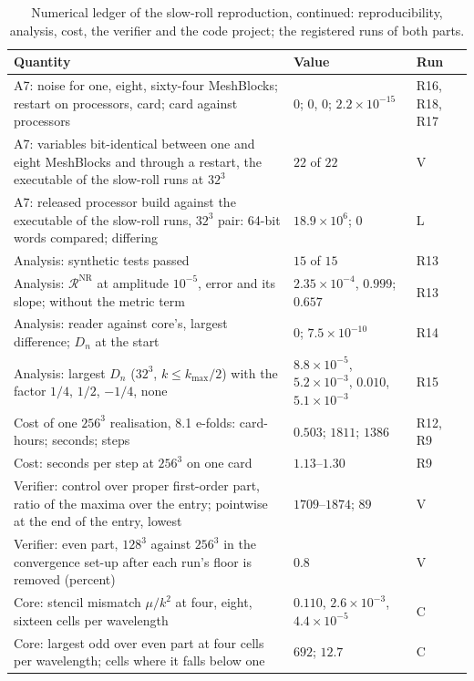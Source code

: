 \begin{table}
\caption{\label{tab:ledgerG1b}Numerical ledger of the slow-roll reproduction, continued: reproducibility, analysis, cost, the verifier and the code project; the registered runs of both parts.}
\begin{ruledtabular}
\footnotesize
\begin{tabular}{p{}p{}p{}}
Quantity & Value & Run \\
\hline
A7: noise for one, eight, sixty-four MeshBlocks; restart on processors, card; card against processors & $0$; $0$, $0$; $2.2\times10^{-15}$ & R16, R18, R17 \\
A7: variables bit-identical between one and eight MeshBlocks and through a restart, the executable of the slow-roll runs at $32^3$ & $22$ of $22$ & V \\
A7: released processor build against the executable of the slow-roll runs, $32^3$ pair: 64-bit words compared; differing & $18.9\times10^{6}$; $0$ & L \\
Analysis: synthetic tests passed & $15$ of $15$ & R13 \\
Analysis: $\mathcal{R}^\mathrm{NR}$ at amplitude $10^{-5}$, error and its slope; without the metric term & $2.35\times10^{-4}$, $0.999$; $0.657$ & R13 \\
Analysis: reader against core's, largest difference; $D_n$ at the start & $0$; $7.5\times10^{-10}$ & R14 \\
Analysis: largest $D_n$ ($32^3$, $k\leq k_\mathrm{max}/2$) with the factor $1/4$, $1/2$, $-1/4$, none & $8.8\times10^{-5}$, $5.2\times10^{-3}$, $0.010$, $5.1\times10^{-3}$ & R15 \\
Cost of one $256^3$ realisation, 8.1 e-folds: card-hours; seconds; steps & $0.503$; $1811$; $1386$ & R12, R9 \\
Cost: seconds per step at $256^3$ on one card & $1.13$--$1.30$ & R9 \\
Verifier: control over proper first-order part, ratio of the maxima over the entry; pointwise at the end of the entry, lowest & $1709$--$1874$; $89$ & V \\
Verifier: even part, $128^3$ against $256^3$ in the convergence set-up after each run's floor is removed (percent) & $0.8$ & V \\
Core: stencil mismatch $\mu/k^2$ at four, eight, sixteen cells per wavelength & $0.110$, $2.6\times10^{-3}$, $4.4\times10^{-5}$ & C \\
Core: largest odd over even part at four cells per wavelength; cells where it falls below one & $692$; $12.7$ & C \\

\end{tabular}
\end{ruledtabular}
\end{table}
